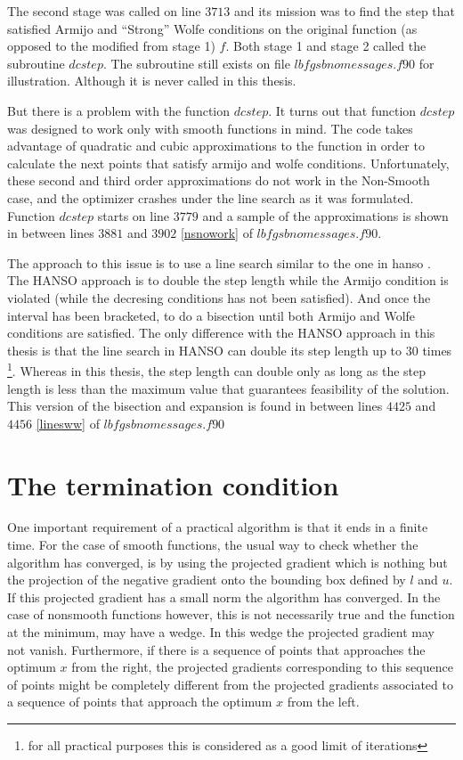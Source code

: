 The second stage was called on line $3713$ and its mission was to find the step that satisfied Armijo and ``Strong'' Wolfe conditions on the original function (as opposed to the modified from stage 1) $f$. Both stage 1 and stage 2 called the subroutine $dcstep$. The subroutine still exists on file $lbfgsbnomessages.f90$ for illustration. Although it is never called in this thesis.

But there is a problem with the function $dcstep$. It turns out that function $dcstep$ was designed to work only with smooth functions in mind. The code takes advantage of quadratic and cubic approximations to the function in order to calculate the next points that satisfy armijo and wolfe conditions. Unfortunately, these second and third order approximations do not work in the Non-Smooth case, and the optimizer crashes under the line search as it was formulated. Function $dcstep$ starts on line $3779$ and a sample of the approximations is shown in between lines $3881$ and $3902$ \ref{nsnowork} of $lbfgsbnomessages.f90$.

The approach to this issue is to use a line search similar to the one in hanso \citep{hanso}. The HANSO approach is to double the step length while the Armijo condition is violated (while the decresing conditions has not been satisfied). And once the interval has been bracketed, to do a bisection until both Armijo and Wolfe conditions are satisfied. The only difference with the HANSO approach in this thesis is that the line search in HANSO can double its step length up to $30$ times \footnote{for all practical purposes this is considered as a good limit of iterations}. Whereas in this thesis, the step length can double only as long as the step length is less than the maximum value that guarantees feasibility of the solution. This version of the bisection and expansion is found in between lines $4425$ and $4456$ \ref{linesww} of $lbfgsbnomessages.f90$


\section{The termination condition}

One important requirement of a practical algorithm is that it ends in a finite time. For the case of smooth functions, the usual way to check whether the algorithm has converged, is by using the projected gradient which is nothing but the projection of the negative gradient onto the bounding box defined by $l$ and $u$. If this projected gradient has a small norm the algorithm has converged. In the case of nonsmooth functions however, this is not necessarily true and the function at the minimum, may have a wedge. In this wedge the projected gradient may not vanish. Furthermore, if there is a sequence of points that approaches the optimum $x$ from the right, the projected gradients corresponding to this sequence of points might be completely different from the projected gradients associated to a sequence of points that approach the optimum $x$ from the left.

